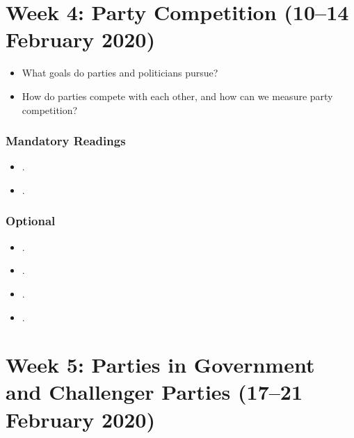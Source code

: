 \documentclass[abstract=on,parskip=full,headings=standardclasses,fontsize=11pt,paper=a4]{scrartcl}
\begin{document}




\section{Week 4:  Party Competition (10--14 February 2020)}

\begin{itemize}
\renewcommand\labelitemi{--}
\item What goals do parties and politicians pursue?
\item How do parties compete with each other, and how can we measure party competition?
\end{itemize}

\subsubsection*{Mandatory Readings}
\begin{itemize}
\item {}.
\item {}.
\end{itemize}

\subsubsection*{Optional}
\begin{itemize}
\item {}.
\item {}.
\item {}.
\item {}.
\end{itemize}



\section{Week 5: Parties in Government and Challenger Parties  (17--21 February 2020)}
\end{document}
